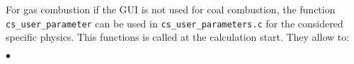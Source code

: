 For gas combustion if the GUI is not used for coal combustion, the
function \texttt{cs\_user\_parameter} can be used in
\texttt{cs\_user\_parameters.c} for the considered specific physics. This
functions is called at the calculation start.
They allow to:
\begin{list}{$\bullet$}{}

\end{list}
